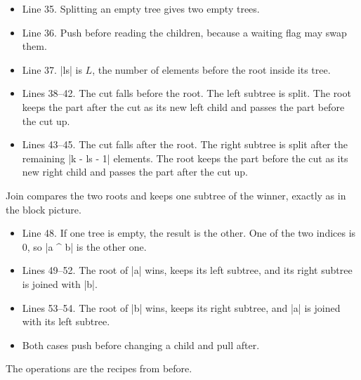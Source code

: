 \begin{notes}
\begin{itemize}
\item Line 35. Splitting an empty tree gives two empty trees.
\item Line 36. Push before reading the children, because a waiting flag may swap them.
\item Line 37. \code|ls| is \(L\), the number of elements before the root inside its tree.
\item Lines 38--42. The cut falls before the root. The left subtree is split. The root keeps the part after the cut as its new left child and passes the part before the cut up.
\item Lines 43--45. The cut falls after the root. The right subtree is split after the remaining \code|k - ls - 1| elements. The root keeps the part before the cut as its new right child and passes the part after the cut up.
\end{itemize}
\end{notes}

Join compares the two roots and keeps one subtree of the winner, exactly as in the block picture.


\begin{notes}
\begin{itemize}
\item Line 48. If one tree is empty, the result is the other. One of the two indices is 0, so \code|a ^ b| is the other one.
\item Lines 49--52. The root of \code|a| wins, keeps its left subtree, and its right subtree is joined with \code|b|.
\item Lines 53--54. The root of \code|b| wins, keeps its right subtree, and \code|a| is joined with its left subtree.
\item Both cases push before changing a child and pull after.
\end{itemize}
\end{notes}

The operations are the recipes from before.


